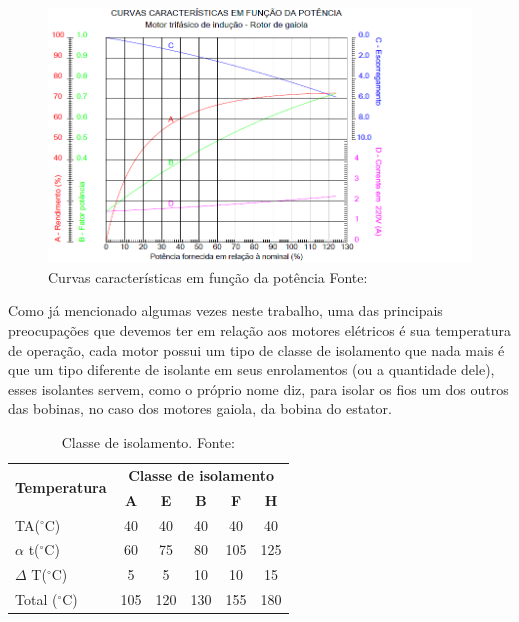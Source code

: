 \begin{figure}[H]
\centering
\includegraphics[scale=0.8]{figuras/Motor_potencia.png}
\caption{Curvas características em função da potência Fonte: \cite{WEG_catalogo} }
\label{fig:Motor_potencia}
\end{figure}


Como já mencionado algumas vezes neste trabalho, uma das principais preocupações que devemos ter em relação aos motores elétricos é sua temperatura de operação, cada motor possui um tipo de classe de isolamento que nada mais é que um tipo diferente de isolante em seus enrolamentos (ou a quantidade dele), esses isolantes servem, como o próprio nome diz, para isolar os fios um dos outros das bobinas, no caso dos motores gaiola, da bobina do estator.\cite{WEG_catalogo}

\begin{table}[H]
\centering
\caption{Classe de isolamento. Fonte:\cite{WEG_catalogo}}
\label{isolamento}
\begin{tabular}{|l|c|c|c|c|c|}
\hline
\multicolumn{1}{|r|}{\multirow{2}{*}{\textbf{Temperatura}}} & \multicolumn{5}{c|}{\textbf{Classe de isolamento}}             \\ \cline{2-6}
\multicolumn{1}{|r|}{}                                      & \textbf{A} & \textbf{E} & \textbf{B} & \textbf{F} & \textbf{H} \\ \hline
TA($^{\circ}$C)                                                      & 40         & 40         & 40         & 40         & 40         \\ \hline
$\alpha$ t($^{\circ}$C)                                              & 60         & 75         & 80         & 105        & 125        \\ \hline
$\Delta$ T($^{\circ}$C)                                              & 5          & 5          & 10         & 10         & 15         \\ \hline
Total ($^{\circ}$C)                                                  & 105        & 120        & 130        & 155        & 180        \\ \hline
\end{tabular}
\end{table}


